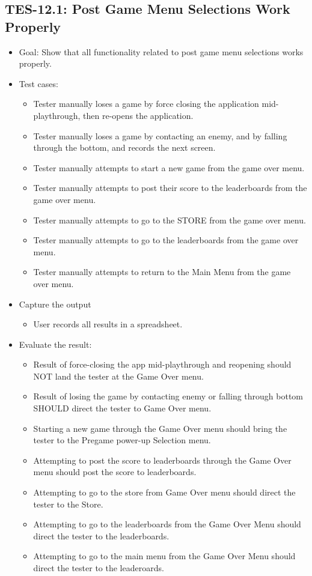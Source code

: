 \subsection{TES-12.1: Post Game Menu Selections Work Properly }
\begin{itemize}
\item Goal: Show that all functionality related to post game menu selections works properly. 

\item Test cases: 
\begin{itemize}
\item Tester manually loses a game by force closing the application mid-playthrough, then re-opens the application.
\item Tester manually loses a game by contacting an enemy, and by falling through the bottom, and records the next screen.
\item Tester manually attempts to start a new game from the game over menu.
\item Tester manually attempts to post their score to the leaderboards from the game over menu.
\item Tester manually attempts to go to the STORE from the game over menu.
\item Tester manually attempts to go to the leaderboards from the game over menu.
\item Tester manually attempts to return to the Main Menu from the game over menu.
\end{itemize}

\item Capture the output 
\begin{itemize}
\item User records all results in a spreadsheet.
\end{itemize}

\item Evaluate the result: 
\begin{itemize}
\item Result of force-closing the app mid-playthrough and reopening should NOT land the tester at the Game Over menu.
\item Result of losing the game by contacting enemy or falling through bottom SHOULD direct the tester to Game Over menu.
\item Starting a new game through the Game Over menu should bring the tester to the Pregame power-up Selection menu.
\item Attempting to post the score to leaderboards through the Game Over menu should post the score to leaderboards.
\item Attempting to go to the store from Game Over menu should direct the tester to the Store.
\item Attempting to go to the leaderboards from the Game Over Menu should direct the tester to the leaderboards.
\item Attempting to go to the main menu from the Game Over Menu should direct the tester to the leaderoards.
\end{itemize}


\end{itemize}
